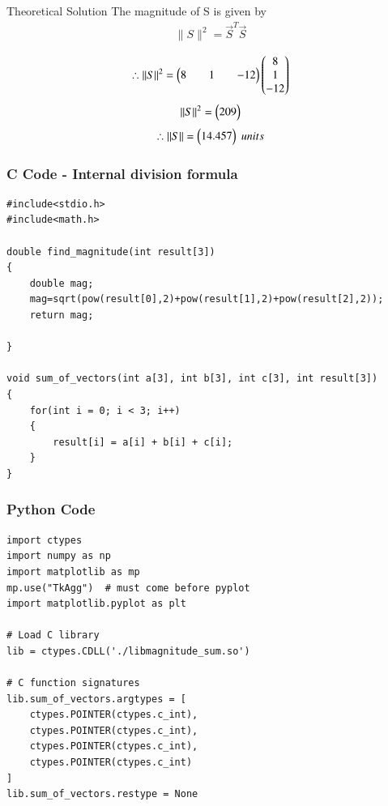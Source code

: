\documentclass{beamer}
\begin{document}
\begin{frame}{Theoretical Solution}
The magnitude of S is given by \\
\begin{align}
    \|S\|^2=\vec{S}^T\vec{S}
\end{align}

\begin{align}
      \therefore\|S\|^2=\begin{myvec}{8&&1&&-12}\end{myvec}\begin{myvec}{8\\1\\-12}
      \end{myvec}
\end{align}
\begin{align}
    \|S\|^2=\begin{pmatrix}209\end{pmatrix}
\end{align}
\begin{align}
    \therefore\|S\|=\begin{pmatrix}14.457\end{pmatrix} \;units
\end{align}
\end{frame}

\begin{frame}[fragile]
    \frametitle{C Code - Internal division formula}

    \begin{lstlisting}
#include<stdio.h>
#include<math.h>

double find_magnitude(int result[3])
{
	double mag;
	mag=sqrt(pow(result[0],2)+pow(result[1],2)+pow(result[2],2));
	return mag;

}

void sum_of_vectors(int a[3], int b[3], int c[3], int result[3])
{
    for(int i = 0; i < 3; i++)
    {
        result[i] = a[i] + b[i] + c[i];
    }
}
    \end{lstlisting}
\end{frame}

\begin{frame}[fragile]
    \frametitle{Python Code}
    \begin{lstlisting}
import ctypes
import numpy as np
import matplotlib as mp
mp.use("TkAgg")  # must come before pyplot
import matplotlib.pyplot as plt

# Load C library
lib = ctypes.CDLL('./libmagnitude_sum.so')

# C function signatures
lib.sum_of_vectors.argtypes = [
    ctypes.POINTER(ctypes.c_int), 
    ctypes.POINTER(ctypes.c_int), 
    ctypes.POINTER(ctypes.c_int), 
    ctypes.POINTER(ctypes.c_int)
]
lib.sum_of_vectors.restype = None




    \end{lstlisting}
\end{frame}
\end{document}
